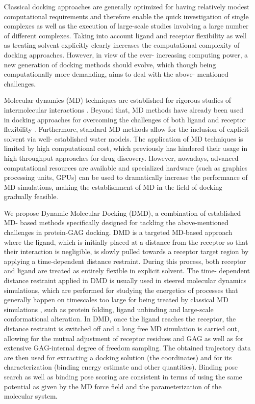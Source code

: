 Classical docking approaches are generally optimized for having relatively
modest computational requirements and therefore enable the quick investigation
of single complexes as well as the execution of large-scale studies involving a
large number of different complexes. Taking into account ligand and receptor
flexibility as well as treating solvent explicitly clearly increases the
computational complexity of docking approaches. However, in view of the ever-
increasing computing power, a new generation of docking methods should evolve,
which though being computationally more demanding, aims to deal with the above-
mentioned challenges.

Molecular dynamics (MD) techniques are established for rigorous studies of
intermolecular interactions \cite{karplus_molecular_2005}. Beyond that, MD
methods have already been used in docking approaches for overcoming the
challenges of both ligand and receptor
flexibility \cite{chaudhuri_application_2012, antes_dynadock_2010}. Furthermore,
standard MD methods allow for the inclusion of explicit solvent via well-
established water models. The application of MD techniques is limited by high
computational cost, which previously has hindered their usage in high-throughput
approaches for drug discovery. However, nowadays, advanced computational
resources are available and specialized hardware (such as graphics processing
units, GPUs) can be used to dramatically increase the performance of MD
simulations, making the establishment of MD in the field of docking gradually
feasible.


We propose Dynamic Molecular Docking (DMD), a combination of established MD-
based methods specifically designed for tackling the above-mentioned challenges
in protein-GAG docking. DMD is a targeted MD-based approach where the ligand,
which is initially placed at a distance from the receptor so that their
interaction is negligible, is slowly pulled towards a receptor target region by
applying a time-dependent distance restraint. During this process, both receptor
and ligand are treated as entirely flexible in explicit solvent. The time-
dependent distance restraint applied in DMD is usually used in steered molecular
dynamics simulations, which are performed for studying the energetics of
processes that generally happen on timescales too large for being treated by
classical MD simulations \cite{xiong_free_2006}, such as protein folding, ligand
unbinding and large-scale conformational alteration. In DMD, once the ligand
reaches the receptor, the distance restraint is switched off and a long free MD
simulation is carried out, allowing for the mutual adjustment of receptor
residues and GAG as well as for extensive GAG-internal degree of freedom
sampling. The obtained trajectory data are then used for extracting a docking
solution (the coordinates) and for its characterization (binding energy estimate
and other quantities). Binding pose search as well as binding pose scoring are
consistent in terms of using the same potential as given by the MD force field
and the parameterization of the molecular system.


